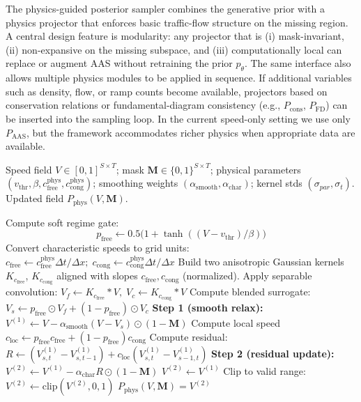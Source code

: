 \documentclass[a4paper,fleqn]{cas-sc}
\numberwithin{equation}{section}
\begin{document}
The physics-guided posterior sampler combines the generative prior with a physics projector that enforces basic traffic-flow structure on the missing region. A central design feature is modularity: any projector that is (i) mask-invariant, (ii) non-expansive on the missing subspace, and (iii) computationally local can replace or augment AAS without retraining the prior $p_\theta$. The same interface also allows multiple physics modules to be applied in sequence. If additional variables such as density, flow, or ramp counts become available, projectors based on conservation relations or fundamental-diagram consistency (e.g., $P_{\text{cons}}$, $P_{\text{FD}}$) can be inserted into the sampling loop. In the current speed-only setting we use only $P_{\text{AAS}}$, but the framework accommodates richer physics when appropriate data are available.
\begin{algorithm}[t]
\caption{\textbf{AAS Projector: Physics-guided Mask-invariant Projection}}
\label{alg:aas-projector}
\begin{algorithmic}[1]
\Require Speed field $V \in [0,1]^{S\times T}$; mask $\mathbf M \in \{0,1\}^{S\times T}$; 
physical parameters $(v_{\text{thr}}, \beta, c^{\text{phys}}_{\text{free}}, c^{\text{phys}}_{\text{cong}})$; 
smoothing weights $(\alpha_{\text{smooth}}, \alpha_{\text{char}})$; 
kernel stds $(\sigma_{par}, \sigma_t)$.
\Ensure Updated field $P_{\text{phys}}(V,\mathbf M)$.

\State Compute soft regime gate:
\[
p_{\text{free}} \gets 0.5\bigl(1+\tanh((V - v_{\text{thr}})/\beta)\bigr)
\]
\State Convert characteristic speeds to grid units:
\(
c_{\text{free}} \gets c^{\text{phys}}_{\text{free}}\Delta t/\Delta x;\;
c_{\text{cong}} \gets c^{\text{phys}}_{\text{cong}}\Delta t/\Delta x
\)
\State Build two anisotropic Gaussian kernels $K_{c_{\text{free}}}$, $K_{c_{\text{cong}}}$ 
aligned with slopes $c_{\text{free}}, c_{\text{cong}}$ (normalized).
\State Apply separable convolution:
\(
V_f \gets K_{c_{\text{free}}}*V,\; V_c \gets K_{c_{\text{cong}}}*V
\)
\State Compute blended surrogate:
\(
V_s \gets p_{\text{free}}\odot V_f + (1-p_{\text{free}})\odot V_c
\)
\State \textbf{Step 1 (smooth relax):}
\(
V^{(1)} \gets V - \alpha_{\text{smooth}}(V - V_s)\odot(1-\mathbf M)
\)
    \State Compute local speed $c_{\text{loc}}\gets p_{\text{free}}c_{\text{free}}+(1-p_{\text{free}})c_{\text{cong}}$
    \State Compute residual:
    \(
    R \gets (V^{(1)}_{s,t}-V^{(1)}_{s,t-1}) + c_{\text{loc}}(V^{(1)}_{s,t}-V^{(1)}_{s-1,t})
    \)
    \State \textbf{Step 2 (residual update):}
    \(
    V^{(2)} \gets V^{(1)} - \alpha_{\text{char}}R\odot(1-\mathbf M)
    \)
\Else
    \State $V^{(2)} \gets V^{(1)}$
\EndIf
\State Clip to valid range:
\(
V^{(2)} \gets \text{clip}(V^{(2)}, 0, 1)
\)
\State \Return $P_{\text{phys}}(V,\mathbf M)=V^{(2)}$
\end{algorithmic}
\end{algorithm}
\end{document}
